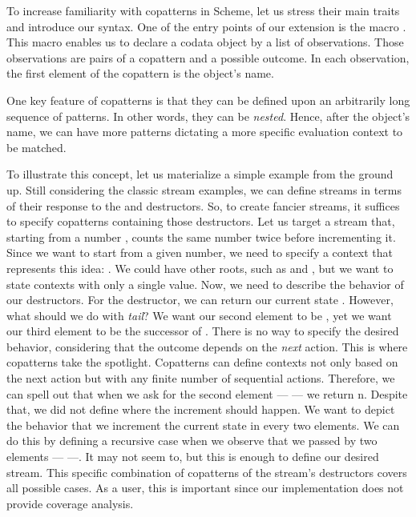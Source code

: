 To increase familiarity with copatterns in Scheme, let us stress their main traits and introduce our syntax.
One of the entry points of our extension is the macro .
This macro enables us to declare a codata object by a list of observations.
Those observations are pairs of a copattern and a possible outcome.
In each observation, the first element of the copattern is the object's name.

One key feature of copatterns is that they can be defined upon an arbitrarily long sequence of patterns.
In other words, they can be \emph{nested}.
Hence, after the object's name, we can have more patterns dictating a more specific evaluation context to be matched.

To illustrate this concept, let us materialize a simple example from the ground up.
Still considering the classic stream examples, we can define streams in terms of their response to the  and  destructors. 
So, to create fancier streams, it suffices to specify copatterns containing those destructors.
Let us target a stream that, starting from a number , counts the same number twice before incrementing it.
Since we want to start from a given number, we need to specify a context that represents this idea: .
We could have other roots, such as  and , but we want to state contexts with only a single value.
Now, we need to describe the behavior of our destructors.
For the  destructor, we can return our current state .
However, what should we do with \emph{tail}?
We want our second element to be , yet we want our third element to be the successor of .
There is no way to specify the desired behavior, considering that the outcome depends on the \emph{next} action. 
This is where copatterns take the spotlight.
 Copatterns can define contexts not only based on the next action but with any finite number of sequential actions.  
Therefore, we can spell out that when we ask for the second element ---  --- we return n.
Despite that, we did not define where the increment should happen.
We want to depict the behavior that we increment the current state in every two elements. 
We can do this by defining a recursive case when we observe that we passed by two elements ---  ---. 
It may not seem to, but this is enough to define our desired stream. This specific combination of copatterns of the stream's destructors covers all possible cases.
As a user, this is important since our implementation does not provide coverage analysis.

